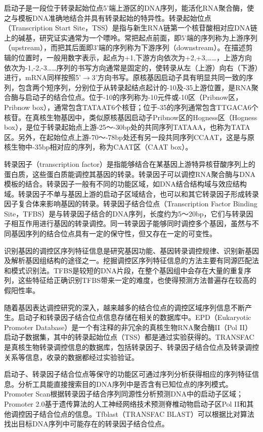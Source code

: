 启动子是一段位于转录起始位点5'端上游区的DNA序列，能活化RNA聚合酶，使之与模板DNA准确地结合并具有转录起始的特异性。转录起始位点（Transcription Start Site，TSS）是指与新生RNA链第一个核苷酸相对应DNA链上的碱基，研究证实通常为一个嘌呤。常把起点前面，即5'端的序列称为上游序列（upstream），而把其后面即3'端的序列称为下游序列（downstream）。在描述剪辑的位置时，一般用数字表示，起点为+1,下游方向依次为+2,+3,……，上游方向依次为-1,-2,-3……序列的书写方向通常是固定的，使转录从左（上游）向右（下游）进行，mRNA同样按照5'$\rightarrow$3'方向书写。原核基因启动子具有明显共同一致的序列，包含两个短序列，分别位于从转录起结点起计的-10及-35上游位置，是RNA聚合酶与启动子的结合位点。位于-10的序列称为-10元件或-10区（Pribnow区，Pribnow box），通常包含TATAAT6个核苷；位于-35的序列通常包含TTGACA6个核苷。在真核生物基因中，类似原核基因启动子Pribnow区的Hogness区（Hogness box），是位于转录起始点上游-25～-30bp处的共同序列TATAAA，也称为TATA区。另外，在起始位点上游-70～-78bp处还有另一段共同序列CCAAT，这是与原核生物中-35bp相对应的序列，称为CAAT区（CAAT box）。

转录因子（transcription factor）是指能够结合在某基因上游特异核苷酸序列上的蛋白质，这些蛋白质能调控其基因的转录。转录因子可以调控RNA聚合酶与DNA模板的结合。转录因子一般有不同的功能区域，如DNA结合结构域与效应结构域。转录因子不单与基因上游的启动子区域结合，也可以和其它转录因子形成转录因子复合体来影响基因的转录。转录因子结合位点（Transcription Factor Binding Site，TFBS）是与转录因子结合的DNA序列，长度约为5～20bp，它们与转录因子相互作用进行基因的转录调控。同一转录因子能够同时调控多个基因，虽然与不同基因序列的结合位点具有一定的保守性，但又存在一定的可变性。

识别基因的调控区序列特征信息是研究基因功能、基因转录调控规律、识别新基因及解析基因组结构的途径之一。挖掘调控区序列特征信息的方法主要有同源匹配法和模式识别法。TFBS是较短的DNA片段，在整个基因组中会存在大量的重复序列，这些特征给正确识别TFBS带来一定的难度，也使得预测方法普遍存在较高的假阳性率。

随着基因表达调控研究的深入，越来越多的结合位点的调控区域序列信息不断产生。启动子和转录因子结合位点信息存储在相关的数据库中。EPD（Eukaryotic Promoter Database）是一个有注释的非冗余的真核生物RNA聚合酶II（Pol II）启动子数据集，其中的转录起始位点（TSS）都是通过实验获得的。TRANSFAC是真核生物转录调控信息的数据库，包括转录因子、转录因子结合位点及转录调控关系等信息，收录的数据都经过实验验证。

启动子、转录因子结合位点等保守的功能区可通过序列分析获得相应的序列特征信息。分析工具能直接搜索目的DNA序列中是否含有已知位点的序列模式。Promoter Scan根据转录因子结合序列同源性分析预测DNA中的启动子区域；Promoter 2.0基于遗传算法的人工神经网络技术预测脊椎动物启动子区Pol II和其他调控因子结合位点的信息。Tfblast（TRANSFAC BLAST）可以根据比对算法找出目标DNA序列中可能存在的转录因子结合位点。

